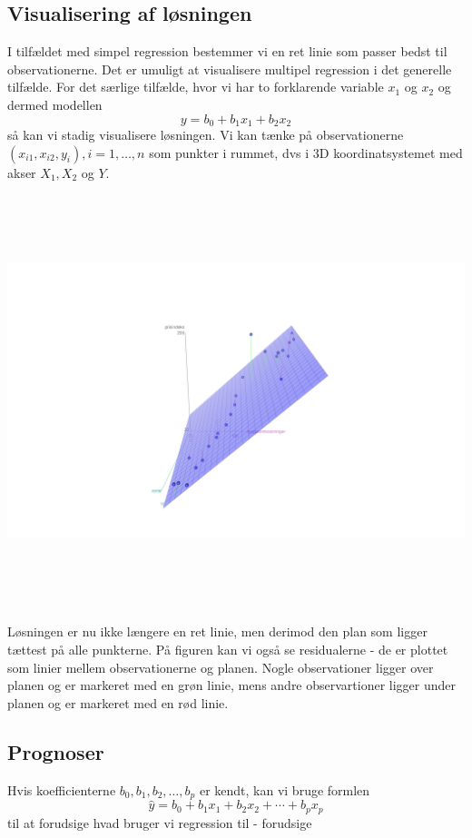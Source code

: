 \subsection{Visualisering af løsningen}
I tilfældet med simpel regression bestemmer vi en ret linie som passer bedst til observationerne. Det er umuligt at visualisere multipel regression i det generelle tilfælde. For det særlige tilfælde, hvor vi har to forklarende variable \(x_1\) og \(x_2\) og dermed modellen
\begin{displaymath}
  y = b_0 + b_1 x_1 + b_2 x_2
\end{displaymath}
så kan vi stadig visualisere løsningen. Vi kan tænke på observationerne \((x_{i1}, x_{i2}, y_i), i=1,\ldots,n\) som punkter i rummet, dvs i 3D koordinatsystemet med akser \(X_1, X_2\) og \(Y\).
\begin{center}
\includegraphics[height=12cm]{regression/images/visualisering.JPG}
\end{center}
Løsningen er nu ikke længere en ret linie, men derimod den plan som ligger tættest på alle punkterne. På figuren kan vi også se residualerne - de er plottet som linier mellem observationerne og planen. Nogle observationer ligger over planen og er markeret med en grøn linie, mens andre observartioner ligger under planen og er markeret med en rød linie.

\subsection{Prognoser}
Hvis koefficienterne \(b_0,b_1,b_2,\ldots,b_p\) er kendt, kan vi bruge formlen
\begin{displaymath}
\hat{y} = b_0 + b_1 x_1 + b_2 x_2 + \cdots + b_p x_p
\end{displaymath}
til at forudsige
hvad bruger vi regression til - forudsige

